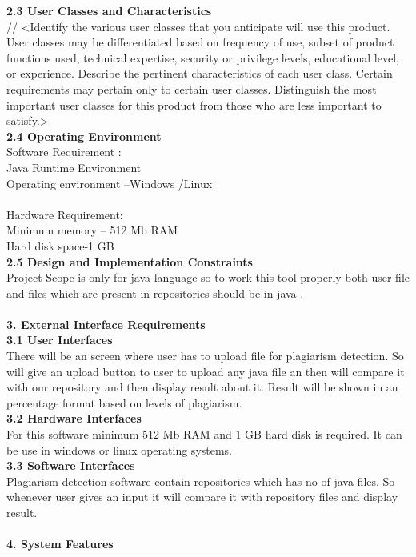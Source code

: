 \textbf{2.3	User Classes and Characteristics}\\
//
<Identify the various user classes that you anticipate will use this product. User classes may be differentiated based on frequency of use, subset of product functions used, technical expertise, security or privilege levels, educational level, or experience. Describe the pertinent characteristics of each user class. Certain requirements may pertain only to certain user classes. Distinguish the most important user classes for this product from those who are less important to satisfy.>\\
\textbf{2.4	Operating Environment}\\
Software Requirement :\\
Java Runtime Environment\\
Operating environment –Windows /Linux\\\\
Hardware Requirement:\\
Minimum memory – 512 Mb  RAM\\
Hard disk space-1 GB\\
\textbf{2.5	Design and Implementation Constraints}\\
Project  Scope is only for java language so to work this tool properly both user file and files which are present in repositories should be  in java .\\\\
\textbf{3.	External Interface Requirements}\\
\textbf{3.1	User Interfaces}\\
There will be an screen where user has to upload file for plagiarism detection. So will give an upload button to user to upload any java file an then will compare it with our repository  and then display result about it. Result will be shown in an percentage format based on levels of plagiarism.\\
\textbf{3.2	Hardware Interfaces}\\
For this software minimum 512 Mb RAM and 1 GB hard disk is required. It can be use in windows or linux operating systems.\\
\textbf{3.3	Software Interfaces}\\
Plagiarism detection software contain repositories which has no of java files. So whenever user gives an input it will compare it with repository files and display result.\\\\
\textbf{4.	System Features}\\
